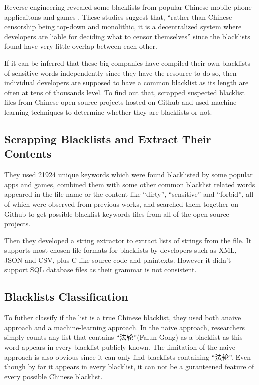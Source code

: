 \documentclass[11pt]{article} %
\begin{document}
Reverse engineering revealed some blacklists from popular Chinese mobile phone applicaitons \cite{knockel2011three} \cite{knockel2015every} and games \cite{knockel2017measuring}. These studies suggest that, ``rather than Chinese censorship being top-down and monolithic, it is a decentralized system where developers are liable for deciding what to censor themselves'' \cite{knockel2018effect} since the blacklists found have very little overlap between each other.

If it can be inferred that these big companies have compiled their own blacklists of sensitive words independently since they have the resource to do so, then individual developers are supposed to have a common blacklist as its length are often at tens of thousands level. To find out that, \cite{knockel2018effect} scrapped suspected blacklist files from Chinese open source projects hosted on Github and used machine-learning techniques to determine whether they are blacklists or not.

\subsection{Scrapping Blacklists and Extract Their Contents}

They used 21924 unique keywords which were found blacklisted by some popular apps and games, combined them with some other common blacklist related words appeared in the file name or the content like ``dirty'', ``sensitive'' and ``forbid'', all of which were observed from previous works, and searched them together on Github to get possible blacklist keywords files from all of the open source projects.

Then they developed a string extractor to extract lists of strings from the file. It supports most-chosen file formats for blacklists by developers such as XML, JSON and CSV, plus C-like source code and plaintexts. However it didn't support SQL database files as their grammar is not consistent.

\subsection{Blacklists Classification}

To futher classify if the list is a true Chinese blacklist, they used both anaive approach and a machine-learning approach. In the naive approach, researchers simply counts any list that contains ``法轮''(Falun Gong) as a blacklist as this word appears in every blacklist publicly known. The limitation of the naive approach is also obvious since it can only find blacklists containing ``法轮''. Even though by far it appears in every blacklist, it can not be a guranteened feature of every possible Chinese blacklist.
\end{document}
